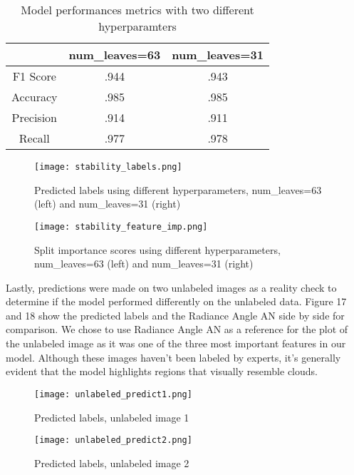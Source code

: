 \documentclass[11pt,letterpaper]{article}
\begin{document}
\begin{center}
\begin{table}[H]
\centering
\caption{Model performances metrics with two different hyperparamters}
\renewcommand{\arraystretch}{1.25}
\begin{tabular}{|c|c|c|}
\hline
 &  num\_leaves=63 & num\_leaves=31 \\ \hline
F1 Score & .944 & .943 \\ \hline
Accuracy & .985 & .985 \\ \hline
Precision & .914 & .911 \\ \hline
Recall & .977 & .978 \\ \hline
\end{tabular}
\end{table}
\end{center}


\begin{figure}
    \centering
    \texttt{[image: stability\_labels.png]}
    \caption{Predicted labels using different hyperparameters, num\_leaves=63 (left) and num\_leaves=31 (right)}
    \label{fig:enter-label}
\end{figure}

\begin{figure}[H]
    \centering
    \texttt{[image: stability\_feature\_imp.png]}
    \caption{Split importance scores using different hyperparameters, num\_leaves=63 (left) and num\_leaves=31 (right)}
    \label{fig:enter-label}
\end{figure}

Lastly, predictions were made on two unlabeled images as a reality check to determine if the model performed differently on the unlabeled data. Figure 17 and 18 show the predicted labels and the Radiance Angle AN side by side for comparison. We chose to use Radiance Angle AN as a reference for the plot of the unlabeled image as it was one of the three most important features in our model. Although these images haven't been labeled by experts, it's generally evident that the model highlights regions that visually resemble clouds.

\begin{figure}[H]
    \centering
    \texttt{[image: unlabeled\_predict1.png]}
    \caption{Predicted labels, unlabeled image 1}
    \label{fig:enter-label}
\end{figure}

\begin{figure}[H]
    \centering
    \texttt{[image: unlabeled\_predict2.png]}
    \caption{Predicted labels, unlabeled image 2}
    \label{fig:enter-label}
\end{figure}
\end{document}
